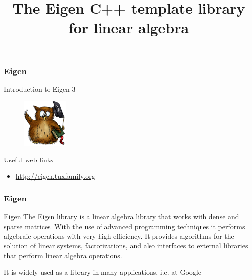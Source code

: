 \documentclass[smaller,a4paper]{beamer}
\begin{document}
\title{The Eigen C++ template library for linear algebra}
\frame{\titlepage}


\begin{frame}

    \frametitle{Eigen}

    \begin{block}{Introduction to}
        \centering
        Eigen 3
    \end{block}

    \begin{figure}
        \centering
        \includegraphics[width=0.2\textwidth]{images/eigen-logo}
    \end{figure}

    \begin{block}{Useful web links}
        \centering
        \begin{itemize}
            \item \url{http://eigen.tuxfamily.org}
        \end{itemize}
    \end{block}

\end{frame}


\begin{frame}

    \frametitle{Eigen}

    \begin{block}{Eigen}
        The Eigen library is a linear algebra library that works with dense and
        sparse matrices. With the use of advanced programming techniques it
        performs algebraic operations with very high efficiency. It provides
        algorithms for the solution of linear systems, factorizations, and also
        interfaces to external libraries that perform linear algebra operations.
    \end{block}

    \vspace{1cm}

    \begin{block}{}
        It is widely used as a library in many applications, i.e. at Google.
    \end{block}

\end{frame}
\end{document}
